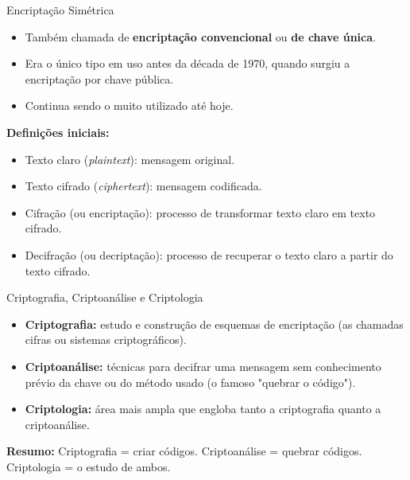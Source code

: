 \begin{frame}{Encriptação Simétrica}
    \begin{itemize}
        \item Também chamada de \textbf{encriptação convencional} ou \textbf{de chave única}.
        \item Era o único tipo em uso antes da década de 1970, quando surgiu a encriptação por chave pública.
        \item Continua sendo o muito utilizado até hoje.
    \end{itemize}

    \vspace{0.3cm}
    \textbf{Definições iniciais:}
    \begin{itemize}
        \item Texto claro (\textit{plaintext}): mensagem original.
        \item Texto cifrado (\textit{ciphertext}): mensagem codificada.
        \item Cifração (ou encriptação): processo de transformar texto claro em texto cifrado.
        \item Decifração (ou decriptação): processo de recuperar o texto claro a partir do texto cifrado.
    \end{itemize}
\end{frame}

\begin{frame}{Criptografia, Criptoanálise e Criptologia}
    \begin{itemize}
        \item \textbf{Criptografia:} estudo e construção de esquemas de encriptação (as chamadas cifras ou sistemas criptográficos).
        \item \textbf{Criptoanálise:} técnicas para decifrar uma mensagem sem conhecimento prévio da chave ou do método usado (o famoso "quebrar o código").
        \item \textbf{Criptologia:} área mais ampla que engloba tanto a criptografia quanto a criptoanálise.
    \end{itemize}

    \vspace{0.4cm}
    \textbf{Resumo:}  
    Criptografia = criar códigos.  
    Criptoanálise = quebrar códigos.  
    Criptologia = o estudo de ambos.
\end{frame}

